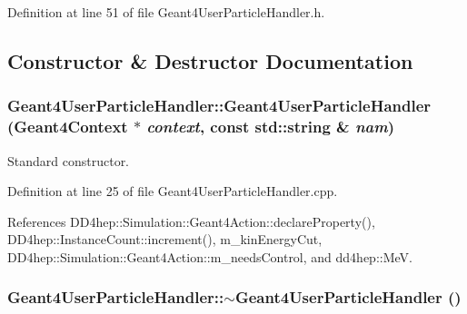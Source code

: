Definition at line 51 of file Geant4UserParticleHandler.h.

\subsection{Constructor \& Destructor Documentation}
\hypertarget{class_d_d4hep_1_1_simulation_1_1_geant4_user_particle_handler_aed274ebbaf0e9c9a1b336298cdbab183}{
\subsubsection[{Geant4UserParticleHandler}]{\setlength{\rightskip}{0pt plus 5cm}Geant4UserParticleHandler::Geant4UserParticleHandler ({\bf Geant4Context} $\ast$ {\em context}, \/  const std::string \& {\em nam})}}
\label{class_d_d4hep_1_1_simulation_1_1_geant4_user_particle_handler_aed274ebbaf0e9c9a1b336298cdbab183}


Standard constructor. 

Definition at line 25 of file Geant4UserParticleHandler.cpp.

References DD4hep::Simulation::Geant4Action::declareProperty(), DD4hep::InstanceCount::increment(), m\_\-kinEnergyCut, DD4hep::Simulation::Geant4Action::m\_\-needsControl, and dd4hep::MeV.\hypertarget{class_d_d4hep_1_1_simulation_1_1_geant4_user_particle_handler_a0e3bc88e6d3a625600006182d5cdd8c0}{
\subsubsection[{$\sim$Geant4UserParticleHandler}]{\setlength{\rightskip}{0pt plus 5cm}Geant4UserParticleHandler::$\sim$Geant4UserParticleHandler ()}}
\label{class_d_d4hep_1_1_simulation_1_1_geant4_user_particle_handler_a0e3bc88e6d3a625600006182d5cdd8c0}


